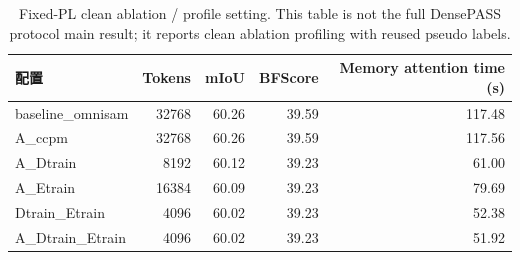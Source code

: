 \begin{table}[t]
  \centering
  \caption{Fixed-PL clean ablation / profile setting. This table is not the full DensePASS protocol main result; it reports clean ablation profiling with reused pseudo labels.}
  \label{tab:memory_ablation}
  \begin{tabular}{lrrrr}
    \toprule
    配置 & Tokens & mIoU & BFScore & Memory attention time (s) \\
    \midrule
    baseline\_omnisam & 32768 & 60.26 & 39.59 & 117.48 \\
    A\_ccpm & 32768 & 60.26 & 39.59 & 117.56 \\
    A\_Dtrain & 8192 & 60.12 & 39.23 & 61.00 \\
    A\_Etrain & 16384 & 60.09 & 39.23 & 79.69 \\
    Dtrain\_Etrain & 4096 & 60.02 & 39.23 & 52.38 \\
    A\_Dtrain\_Etrain & 4096 & 60.02 & 39.23 & 51.92 \\
    \bottomrule
  \end{tabular}
\end{table}
